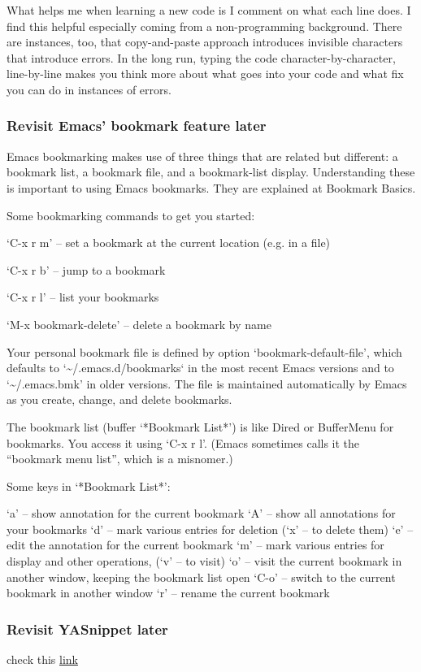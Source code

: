 \documentclass[11pt]{article}
\begin{document}
What helps me when learning a new code is I comment on what each line does. I
find this helpful especially coming from a non-programming background. There are
instances, too, that copy-and-paste approach introduces invisible characters
that introduce errors. In the long run, typing the code character-by-character,
line-by-line makes you think more about what goes into your code and what fix
you can do in instances of errors.
\subsubsection*{Revisit Emacs' \textbf{bookmark} feature later}
\label{sec:orgheadline96}
Emacs bookmarking makes use of three things that are related but different: a
bookmark list, a bookmark file, and a bookmark-list display. Understanding these
is important to using Emacs bookmarks. They are explained at Bookmark Basics.

Some bookmarking commands to get you started:

‘C-x r m’ – set a bookmark at the current location (e.g. in a file)

‘C-x r b’ – jump to a bookmark

‘C-x r l’ – list your bookmarks

‘M-x bookmark-delete’ – delete a bookmark by name

Your personal bookmark file is defined by option ‘bookmark-default-file’, which
defaults to `\textasciitilde{}/.emacs.d/bookmarks` in the most recent Emacs versions and to
`\textasciitilde{}/.emacs.bmk’ in older versions. The file is maintained automatically by Emacs
as you create, change, and delete bookmarks.

The bookmark list (buffer ‘*Bookmark List*’) is like Dired or BufferMenu for
bookmarks. You access it using ‘C-x r l’. (Emacs sometimes calls it the
“bookmark menu list”, which is a misnomer.)

Some keys in ‘*Bookmark List*’:

‘a’ – show annotation for the current bookmark
‘A’ – show all annotations for your bookmarks
‘d’ – mark various entries for deletion (‘x’ – to delete them)
‘e’ – edit the annotation for the current bookmark
‘m’ – mark various entries for display and other operations, (‘v’ – to visit)
‘o’ – visit the current bookmark in another window, keeping the bookmark list open
‘C-o’ – switch to the current bookmark in another window
‘r’ – rename the current bookmark
\subsubsection*{Revisit YASnippet later}
\label{sec:orgheadline97}
check this \href{http://tex.stackexchange.com/questions/51204/working-with-templates/51250#51250}{link}
\end{document}
